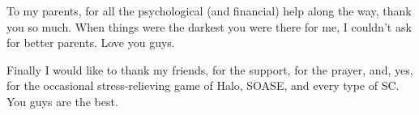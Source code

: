 \documentclass[12pt]{report}
\numberwithin{algorithm}{chapter}
\begin{document}
To my parents, for all the psychological (and financial) help along the way,
thank you so much. When things were the darkest you were there for me, I couldn't
ask for better parents. Love you guys.

Finally I would like to thank my friends, for the support, for the prayer,
and, yes, for the occasional stress-relieving game of Halo, SOASE, and every
type of SC.  You guys are the best. 

\tableofcontents
\pagebreak

\listoffigures
\pagebreak

\listoftables
\pagebreak

\pagestyle{myheadings}











%
%
%
%

\end{document}
